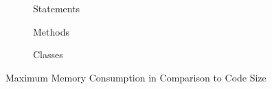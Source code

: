 \documentclass[../draft.tex]{subfiles}
\begin{document}
    \begin{figure}[tbp]
        \centering
        \begin{subfigure}[b]{\textwidth}
            \centering
            \begin{subfigure}[]{0.45\textwidth}
                \centering
                \resizebox{\columnwidth}{!}{
                    
                }
            \end{subfigure}
            \qquad
            \begin{subfigure}[]{0.45\textwidth}
                \centering
                \resizebox{\columnwidth}{!}{
                    
                }
            \end{subfigure}
            \caption{Statements}
        \end{subfigure}
        \bigbreak
        \begin{subfigure}[b]{\textwidth}
            \centering
            \begin{subfigure}[]{0.45\textwidth}
                \centering
                \resizebox{\columnwidth}{!}{
                    
                }
            \end{subfigure}
            \qquad
            \begin{subfigure}[]{0.45\textwidth}
                \centering
                \resizebox{\columnwidth}{!}{
                    
                }
            \end{subfigure}
            \caption{Methods}
        \end{subfigure}
        \bigbreak
        \begin{subfigure}[b]{\textwidth}
            \centering
            \begin{subfigure}[]{0.45\textwidth}
                \centering
                \resizebox{\columnwidth}{!}{
                    
                }
            \end{subfigure}
            \qquad
            \begin{subfigure}[]{0.45\textwidth}
                \centering
                \resizebox{\columnwidth}{!}{
                    
                }
            \end{subfigure}
            \caption{Classes}
        \end{subfigure}
        \caption{Maximum Memory Consumption in Comparison to Code Size}
        \label{f:maxmemtocodesize}
    \end{figure}
\end{document}
